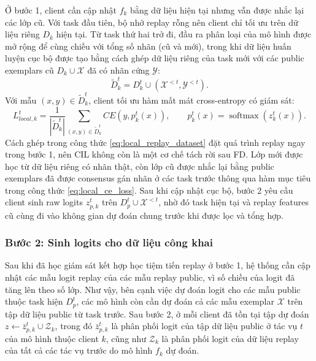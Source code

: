 Ở bước 1, client cần cập nhật $f_k$ bằng dữ liệu hiện tại nhưng vẫn được nhắc lại các lớp cũ. Với task đầu tiên, bộ nhớ replay rỗng nên client chỉ tối ưu trên dữ liệu riêng $D_k$ hiện tại. Từ task thứ hai trở đi, đầu ra phân loại của mô hình được mở rộng để cùng chiều với tổng số nhãn (cũ và mới), trong khi dữ liệu huấn luyện cục bộ được tạo bằng cách ghép dữ liệu riêng của task mới với các public exemplars cũ $D_k \cup \mathcal X$ đã có nhãn cứng $\mathcal Y$:
\begin{equation}
\label{eq:local_replay_dataset}
	\tilde D_k^t=D_k^t\cup(\mathcal X^{<t},\mathcal Y^{<t}).
\end{equation}
Với mẫu $(x,y)\in\tilde D_k^t$, client tối ưu hàm mất mát cross-entropy có giám sát:
\begin{equation}
\label{eq:local_ce_loss}
L_{local,k}^t=\frac{1}{|\tilde D_k^t|}\sum_{(x,y)\in\tilde D_k^t}CE(y,p_k^t(x)),
\qquad p_k^t(x)=\operatorname{softmax}(z_k^t(x)).
\end{equation}
Cách ghép trong công thức \ref{eq:local_replay_dataset} đặt quá trình replay ngay trong bước 1, nên CIL không còn là một cơ chế tách rời sau FD. Lớp mới được học từ dữ liệu riêng có nhãn thật, còn lớp cũ được nhắc lại bằng public exemplars đã được consensus gán nhãn ở các task trước thông qua hàm mục tiêu trong công thức \ref{eq:local_ce_loss}. Sau khi cập nhật cục bộ, bước 2 yêu cầu client sinh raw logits $z_{p,k}^t$ trên $D_p^t\cup\mathcal X^{<t}$, nhờ đó task hiện tại và replay features cũ cùng đi vào không gian dự đoán chung trước khi được lọc và tổng hợp.

\subsubsection{Bước 2: Sinh logits cho dữ liệu công khai}

Sau khi đã học giám sát kết hợp học tiệm tiến replay ở bước 1, hệ thống cần cập nhật các mẫu logit replay của các mẫu replay public, vì số chiều của logit đã tăng lên theo số lớp. Như vậy, bên cạnh việc dự đoán logit cho các mẫu public thuộc task hiện $D_p^t$, các mô hình còn cần dự đoán cả các mẫu exemplar $\mathcal X$ trên tập dữ liệu public từ task trước. Sau bước 2, ở mỗi client đã tồn tại tập dự đoán $z \leftarrow \bar z_{p,k}^t \cup \mathcal Z_k$, trong đó $\bar z_{p,k}^t$ là phân phối logit của tập dữ liệu public ở tác vụ $t$ của mô hình thuộc client $k$, cũng như $\mathcal Z_k$ là phân phối logit của dữ liệu replay của tất cả các tác vụ trước do mô hình $f_k$ dự đoán.


